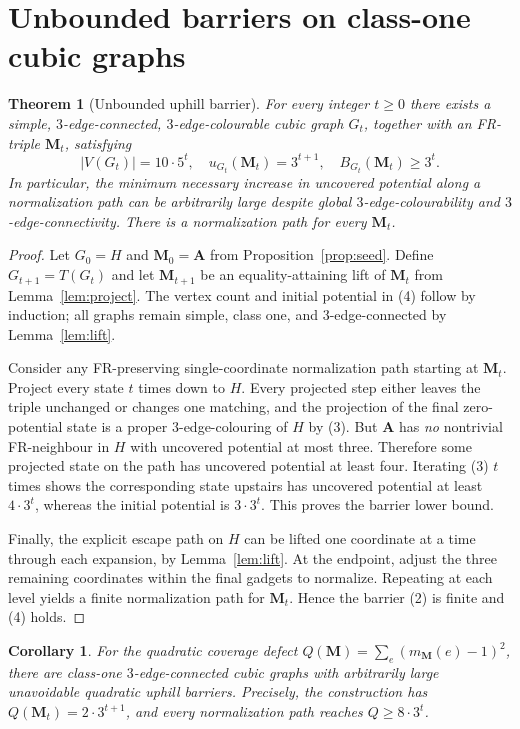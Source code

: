 \documentclass[11pt]{article}
\newtheorem{theorem}{Theorem}
\newtheorem{corollary}{Corollary}
\begin{document}
\section{Unbounded barriers on class-one cubic graphs}
\begin{theorem}[Unbounded uphill barrier]\label{thm:main}
For every integer $t\ge0$ there exists a simple, $3$-edge-connected, $3$-edge-colourable cubic graph $G_t$, together with an FR-triple $\mathbf M_t$, satisfying
\[
 |V(G_t)|=10\cdot5^t,\quad u_{G_t}(\mathbf M_t)=3^{t+1},\quad B_{G_t}(\mathbf M_t)\ge3^t. \tag{4}
\]
In particular, the minimum necessary \emph{increase} in uncovered potential along a normalization path can be arbitrarily large despite global $3$-edge-colourability and $3$-edge-connectivity. There is a normalization path for every $\mathbf M_t$.
\end{theorem}
\begin{proof}
Let $G_0=H$ and $\mathbf M_0=\mathbf A$ from Proposition~\ref{prop:seed}. Define $G_{t+1}=T(G_t)$ and let $\mathbf M_{t+1}$ be an equality-attaining lift of $\mathbf M_t$ from Lemma~\ref{lem:project}. The vertex count and initial potential in (4) follow by induction; all graphs remain simple, class one, and $3$-edge-connected by Lemma~\ref{lem:lift}.

Consider any FR-preserving single-coordinate normalization path starting at $\mathbf M_t$. Project every state $t$ times down to $H$. Every projected step either leaves the triple unchanged or changes one matching, and the projection of the final zero-potential state is a proper $3$-edge-colouring of $H$ by (3). But $\mathbf A$ has \emph{no} nontrivial FR-neighbour in $H$ with uncovered potential at most three. Therefore some projected state on the path has uncovered potential at least four. Iterating (3) $t$ times shows the corresponding state upstairs has uncovered potential at least $4\cdot3^t$, whereas the initial potential is $3\cdot3^t$. This proves the barrier lower bound.

Finally, the explicit escape path on $H$ can be lifted one coordinate at a time through each expansion, by Lemma~\ref{lem:lift}. At the endpoint, adjust the three remaining coordinates within the final gadgets to normalize. Repeating at each level yields a finite normalization path for $\mathbf M_t$. Hence the barrier (2) is finite and (4) holds.
\end{proof}

\begin{corollary}
For the quadratic coverage defect $Q(\mathbf M)=\sum_e(m_{\mathbf M}(e)-1)^2$, there are class-one $3$-edge-connected cubic graphs with arbitrarily large unavoidable quadratic uphill barriers. Precisely, the construction has $Q(\mathbf M_t)=2\cdot3^{t+1}$, and every normalization path reaches $Q\ge8\cdot3^t$.
\end{corollary}
\end{document}
